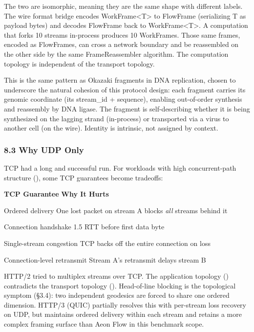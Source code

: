 \documentclass[
]{article}
\begin{document}
The two are isomorphic, meaning they are the same shape with different
labels. The wire format bridge encodes
WorkFrame\textless T\textgreater{} to FlowFrame (serializing T as
payload bytes) and decodes FlowFrame back to
WorkFrame\textless T\textgreater. A computation that forks 10 streams
in-process produces 10 WorkFrames. Those same frames, encoded as
FlowFrames, can cross a network boundary and be reassembled on the other
side by the same FrameReassembler algorithm. The computation topology is
independent of the transport topology.

This is the same pattern as Okazaki fragments in DNA replication, chosen
to underscore the natural cohesion of this protocol design: each
fragment carries its genomic coordinate (its stream\_id + sequence),
enabling out-of-order synthesis and reassembly by DNA ligase. The
fragment is self-describing whether it is being synthesized on the
lagging strand (in-process) or transported via a virus to another cell
(on the wire). Identity is intrinsic, not assigned by context.

\subsubsection{\texorpdfstring{\textbf{8.3 Why UDP
Only}}{8.3 Why UDP Only}}\label{why-udp-only}

TCP had a long and successful run. For workloads with high
concurrent-path structure (), some TCP guarantees become tradeoffs:

\textbf{TCP Guarantee} \textbar{} \textbf{Why It Hurts} \textbar{}

Ordered delivery \textbar{} One lost packet on stream A blocks
\emph{all} streams behind it \textbar{}

Connection handshake \textbar{} 1.5 RTT before first data byte
\textbar{}

Single-stream congestion \textbar{} TCP backs off the entire connection
on loss \textbar{}

Connection-level retransmit \textbar{} Stream A's retransmit delays
stream B \textbar{}

HTTP/2 tried to multiplex streams over TCP. The application topology ()
contradicts the transport topology (). Head-of-line blocking is the
topological symptom (§3.4): two independent geodesics are forced to
share one ordered dimension. HTTP/3 (QUIC) partially resolves this with
per-stream loss recovery on UDP, but maintains ordered delivery within
each stream and retains a more complex framing surface than Aeon Flow in
this benchmark scope.
\end{document}
